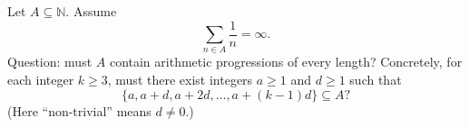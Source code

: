 Let $A\subseteq\mathbb{N}$. Assume
\[
\sum_{n\in A} \frac{1}{n} = \infty.
\]
Question: must $A$ contain arithmetic progressions of every length? Concretely, for each integer $k\ge 3$, must there exist integers $a\ge 1$ and $d\ge 1$ such that
\[
\{a,a+d,a+2d,\dots,a+(k-1)d\}\subseteq A?
\]
(Here ``non-trivial'' means $d\ne 0$.)
